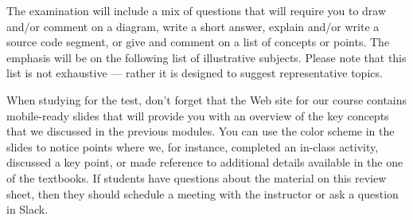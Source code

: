 \documentclass[11pt]{article}
\begin{document}
\noindent The examination will include a mix of questions that will require you
to draw and/or comment on a diagram, write a short answer, explain and/or write
a source code segment, or give and comment on a list of concepts or points. The
emphasis will be on the following list of illustrative subjects. Please note
that this list is not exhaustive --- rather it is designed to suggest
representative topics.

When studying for the test, don't forget that the Web site for our course
contains mobile-ready slides that will provide you with an overview of the key
concepts that we discussed in the previous modules. You can use the color scheme
in the slides to notice points where we, for instance, completed an in-class
activity, discussed a key point, or made reference to additional details
available in the one of the textbooks. If students have questions about the
material on this review sheet, then they should schedule a meeting with the
instructor or ask a question in Slack.

\end{document}
